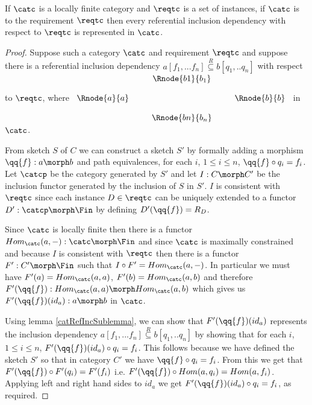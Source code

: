 \begin{lemma}
\label{catincdsrepresented}
If $\catc$ is a locally finite category and $\reqtc$ is a set of instances, if $\catc$ is 
 to the requirement $\reqtc$ then
every referential inclusion dependency with respect to $\reqtc$ is represented in $\catc$.
\end{lemma} 
\begin{proof}
Suppose such  a category $\catc$ and  requirement $\reqtc$ 
 and suppose there is a referential inclusion dependency
$a[f_1,...f_n] \overset{R}{\subseteq} b[q_1,..q_n]$ with respect to $\reqtc$,
where
$
\begin{array}{c p{0.25cm} c  p{0.25cm} c }
             &&   \Rnode{b1}{b_1} &&              \\[0.4cm]
\Rnode{a}{a} &&                   && \Rnode{b}{b} \\[0.4cm]
             &&   \Rnode{bn}{b_n} &&              
\end{array} 
$
in $\catc$. 

From sketch $S$ of $C$ we can construct a sketch $S'$ by formally adding a morphism $\qq{f}: a \morph b$
and path equivalences, for each $i$, $1 \leq i \leq n$, $\qq{f} \circ q_i = f_i$. Let $\catcp$ be the category generated by $S'$ and
let $I: C \morph C'$ be the inclusion functor generated by the inclusion of $S$ in $S'$. $I$ is consistent with $\reqtc$ since
each instance $D \in  \reqtc$ can be uniquely extended to a functor $D': \catcp \morph \Fin$ by defining $D'(\qq{f})=R_D$.

Since $\catc$ is locally finite then there is a functor $Hom_{\catc}(a,-): \catc \morph \Fin$ and since $\catc$ is maximally constrained and because $I$ is consistent with $\reqtc$ then there is a functor $F': C' \morph \Fin$
such that $I \circ F' = Hom_{\catc}(a,-)$. In particular we must have 
$F'(a)=Hom_{\catc}(a,a)$,
$F'(b)=Hom_{\catc}(a,b)$ and therefore $F'(\qq{f}):Hom_{\catc}(a,a) \morph Hom_{\catc}(a,b)$ which gives us
$F'(\qq{f})(id_a): a \morph b$ in $\catc$. 


Using lemma \ref{catRefIncSublemma}, we can show that $F'(\qq{f})(id_a)$
represents the inclusion dependency $a[f_1,...f_n] \overset{R}{\subseteq} b[q_1,..q_n]$
by showing that for each $i$, $1 \leq i \leq n$, $F'(\qq{f})(id_a) \circ q_i = f_i$. 
This follows because we have defined
the sketch $S'$ so that in category $C'$ we have $\qq{f} \circ q_i = f_i$. 
From this we get that 
$F'(\qq{f}) \circ F'(q_i) = F'(f_i)$ i.e. $F'(\qq{f}) \circ Hom(a,q_i) = Hom(a,f_i)$. 
Applying left and right hand sides to $id_a$ we get $F'(\qq{f})(id_a) \circ q_i = f_i$, as required.
\end{proof}


